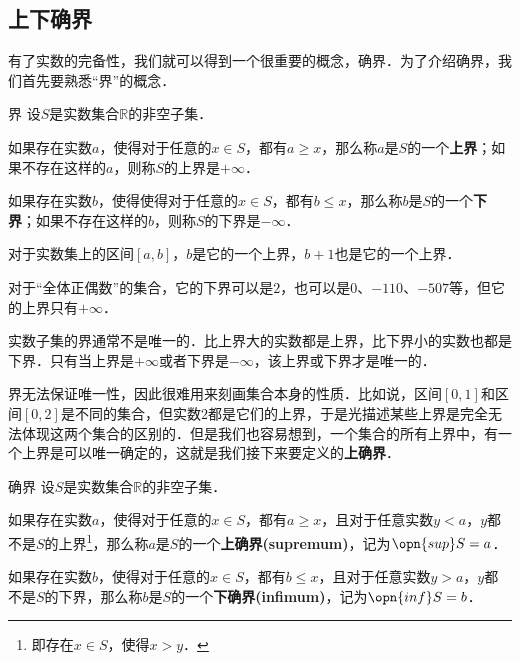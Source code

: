 
\begin{issues}
\issueDraft
\end{issues}



\subsection{上下确界}

有了实数的完备性，我们就可以得到一个很重要的概念，确界．为了介绍确界，我们首先要熟悉“界”的概念．

\begin{definition}{界}
设$S$是实数集合$\mathbb{R}$的非空子集．

如果存在实数$a$，使得对于任意的$x\in S$，都有$a\geq x$，那么称$a$是$S$的一个\textbf{上界}；如果不存在这样的$a$，则称$S$的上界是$+\infty$．

如果存在实数$b$，使得使得对于任意的$x\in S$，都有$b\leq x$，那么称$b$是$S$的一个\textbf{下界}；如果不存在这样的$b$，则称$S$的下界是$-\infty$．
\end{definition}

\begin{example}{}
对于实数集上的区间$[a, b]$，$b$是它的一个上界，$b+1$也是它的一个上界．

对于“全体正偶数”的集合，它的下界可以是$2$，也可以是$0$、$-110$、$-507$等，但它的上界只有$+\infty$．
\end{example}

实数子集的界通常不是唯一的．比上界大的实数都是上界，比下界小的实数也都是下界．只有当上界是$+\infty$或者下界是$-\infty$，该上界或下界才是唯一的．

界无法保证唯一性，因此很难用来刻画集合本身的性质．比如说，区间$[0, 1]$和区间$[0, 2]$是不同的集合，但实数$2$都是它们的上界，于是光描述某些上界是完全无法体现这两个集合的区别的．但是我们也容易想到，一个集合的所有上界中，有一个上界是可以唯一确定的，这就是我们接下来要定义的\textbf{上确界}．

\begin{definition}{确界}
设$S$是实数集合$\mathbb{R}$的非空子集．

如果存在实数$a$，使得对于任意的$x\in S$，都有$a\geq x$，且对于任意实数$y<a$，$y$都不是$S$的上界\footnote{即存在$x\in S$，使得$x>y$．}，那么称$a$是$S$的一个\textbf{上确界(supremum)}，记为$\opn{sup} S=a$．

如果存在实数$b$，使得对于任意的$x\in S$，都有$b\leq x$，且对于任意实数$y>a$，$y$都不是$S$的下界，那么称$b$是$S$的一个\textbf{下确界(infimum)}，记为$\opn{inf} S=b$．



\end{definition}


